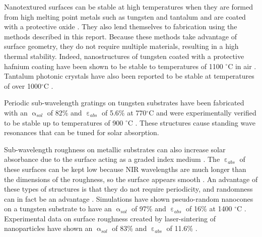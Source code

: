 \documentclass[10pt,letterpaper]{article}
\begin{document}
{Nanotextured surfaces can be stable at high temperatures when they are 
formed from high melting point metals such as tungsten and tantalum and are coated with a protective oxide \cite{paper1_ref5}.  They also lend themselves to fabrication using the methods described in this report.  Because these methods take advantage of surface geometry, they do not require multiple materials, resulting in a high thermal stability.  Indeed, nanostructures of tungsten coated with a protective hafnium coating have been shown to be stable to temperatures of 1100 $^\circ$C in air \cite{paper1_ref5,Therm_stabil_W_microstructures}.  Tantalum photonic crystals have also been reported to be stable at temperatures of over 1000$^\circ$C \cite{photonic_crystal_rev}.

Periodic sub-wavelength gratings on tungsten substrates have been fabricated with an $\upalpha_{sol}$ of 82\% and $\upepsilon_{abs}$ of 5.6\% at 770$^\circ$C and were experimentally verified to be 
stable up to temperatures of 900 $^\circ$C \cite{A13}.  These structures cause standing wave resonances that can be tuned for solar absorption.

Sub-wavelength roughness on metallic substrates can also increase solar absorbance due to the surface acting as a graded index medium \cite{A13,A19}.  The $\upepsilon_{abs}$ of these surfaces can be kept low because NIR wavelengths are much longer than the dimensions of the roughness, so the surface appears smooth \cite{A14}.  An advantage of these types of structures is that they do not require periodicity, and randomness can in fact be an advantage \cite{me1}.  Simulations have shown pseudo-random nanocones on a tungsten substrate to have an $\upalpha_{sol}$ of 97\% and $\upepsilon_{abs}$ of 16\% at 1400 $^\circ$C \cite{me1}.  Experimental data on surface roughness created by laser-sintering of nanoparticles have shown an $\upalpha_{sol}$ of 83\% and $\upepsilon_{abs}$ of 11.6\% \cite{g21}.

}
\end{document}
